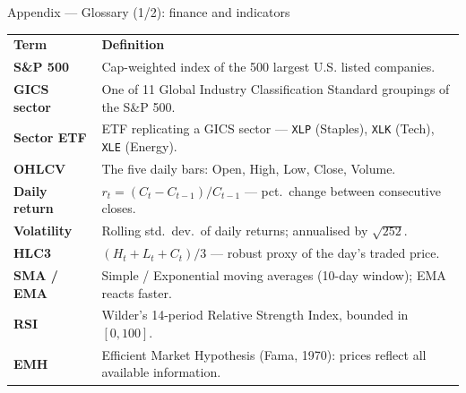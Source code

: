 \documentclass[aspectratio=169,11pt]{beamer}
\newcommand{\heading}[1]{{\color{TecBlue}\textbf{#1}}}
\begin{document}
\begin{frame}{Appendix --- Glossary (1/2): finance and indicators}
\scriptsize
\renewcommand{\arraystretch}{1.10}
\begin{tabular}{@{}p{2.8cm} p{\dimexpr\linewidth-2.8cm-2\tabcolsep\relax}@{}}
\rowcolor{TecBlue}
{\color{white}\textbf{Term}} & {\color{white}\textbf{Definition}} \\
\heading{S\&P 500}      & Cap-weighted index of the 500 largest U.S. listed companies. \\
\heading{GICS sector}   & One of 11 Global Industry Classification Standard groupings of the S\&P 500. \\
\heading{Sector ETF}    & ETF replicating a GICS sector --- \texttt{XLP} (Staples), \texttt{XLK} (Tech), \texttt{XLE} (Energy). \\
\heading{OHLCV}         & The five daily bars: Open, High, Low, Close, Volume. \\
\heading{Daily return}  & $r_t = (C_t - C_{t-1})/C_{t-1}$ --- pct.\ change between consecutive closes. \\
\heading{Volatility}    & Rolling std.\ dev.\ of daily returns; annualised by $\sqrt{252}$. \\
\heading{HLC3}          & $(H_t + L_t + C_t)/3$ --- robust proxy of the day's traded price. \\
\heading{SMA / EMA}     & Simple / Exponential moving averages (10-day window); EMA reacts faster. \\
\heading{RSI}           & Wilder's 14-period Relative Strength Index, bounded in $[0,100]$. \\
\heading{EMH}           & Efficient Market Hypothesis (Fama, 1970): prices reflect all available information. \\
\end{tabular}
\end{frame}
\end{document}
